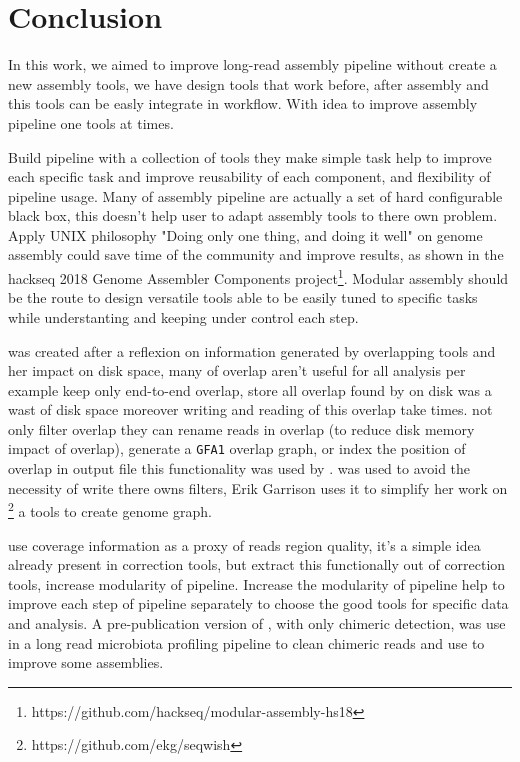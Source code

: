 \documentclass[main.tex]{subfiles}
\begin{document}
\chapter{Conclusion}

In this work, we aimed to improve long-read assembly pipeline without create a new assembly tools, we have design tools that work before, after assembly and this tools can be easly integrate in workflow. With idea to improve assembly pipeline one tools at times.

Build pipeline with a collection of tools they make simple task help to improve each specific task and improve reusability of each component, and flexibility of pipeline usage. Many of assembly pipeline are actually a set of hard configurable black box, this doesn't help user to adapt assembly tools to there own problem. Apply UNIX philosophy "Doing only one thing, and doing it well" on genome assembly could save time of the community and improve results, as shown in the hackseq 2018 Genome Assembler Components project\footnote{https://github.com/hackseq/modular-assembly-hs18}. Modular assembly should be the route to design versatile tools able to be easily tuned to specific tasks while understanting and keeping under control each step.

\fpa was created after a reflexion on information generated by overlapping tools and her impact on disk space, many of overlap aren't useful for all analysis per example \miniasm keep only end-to-end overlap, store all overlap found by \minimap on disk was a wast of disk space moreover writing and reading of this overlap take times. \fpa not only filter overlap they can rename reads in overlap (to reduce disk memory impact of overlap), generate a \texttt{GFA1} overlap graph, or index the position of overlap in output file this functionality was used by \consent \cite{CONSENT}. \fpa was used to avoid the necessity of write there owns filters, Erik Garrison uses it to simplify her work on \footnote{https://github.com/ekg/seqwish} a tools to create genome graph.

\yacrd use coverage information as a proxy of reads region quality, it's a simple idea already present in correction tools, but extract this functionally out of correction tools, increase modularity of pipeline. Increase the modularity of pipeline help to improve each step of pipeline separately to choose the good tools for specific data and analysis. A pre-publication version of \yacrd, with only chimeric detection, was use in a long read microbiota profiling pipeline to clean chimeric reads \cite{cite_yacrd} and use to improve some \flye assemblies. 
\end{document}
